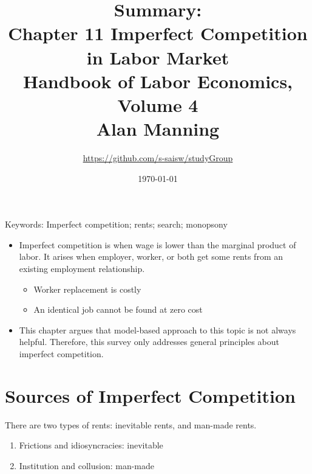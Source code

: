 \documentclass[a4paper, 12pt]{article}
\begin{document}
\pagestyle{fancy}
\setlength{\parindent}{5ex}
\setlength{\columnseprule}{0.5pt}

\title{Summary:
\\Chapter 11 Imperfect Competition in Labor Market \\
\large Handbook of Labor Economics, Volume 4 \\
\large Alan Manning
}
\author{\url{https://github.com/s-saisw/studyGroup}}
\date{\today}
\maketitle

\lhead{}

\begin{flushright}
Keywords: Imperfect competition; rents; search; monopsony
\end{flushright}

\begin{itemize}
\item Imperfect competition is when wage is lower than the marginal product of labor. It arises when employer, worker, or both get some rents from an existing employment relationship.
\begin{itemize}
\item Worker replacement is costly
\item An identical job cannot be found at zero cost
\end{itemize}
\item This chapter argues that model-based approach to this topic is not always helpful. Therefore, this survey only addresses general principles about imperfect competition.
\end{itemize}

\section{Sources of Imperfect Competition}
There are two types of rents: inevitable rents, and man-made rents.
\begin{enumerate}
\item Frictions and idiosyncracies: inevitable
\item Institution and collusion: man-made
\end{enumerate}
\end{document}
